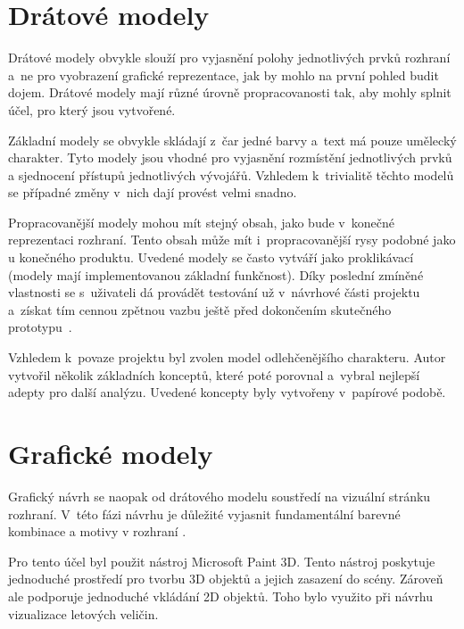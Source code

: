 \section{Drátové modely} %
Drátové modely obvykle slouží pro vyjasnění polohy jednotlivých prvků rozhraní a~ne  pro vyobrazení grafické reprezentace, jak by mohlo na první pohled budit dojem. Drátové modely mají různé úrovně propracovanosti tak, aby mohly splnit účel, pro který jsou vytvořené.

Základní modely se obvykle skládají z~čar jedné barvy a~text má pouze umělecký charakter. Tyto modely jsou vhodné pro vyjasnění rozmístění jednotlivých prvků a sjednocení přístupů jednotlivých vývojářů. Vzhledem k~trivialitě těchto modelů se případné změny v~nich dají provést velmi snadno.

Propracovanější modely mohou mít stejný obsah, jako bude v~konečné reprezentaci rozhraní. Tento obsah může mít i~propracovanější rysy podobné jako u konečného produktu. Uvedené modely se často vytváří jako proklikávací (modely mají implementovanou základní funkčnost). Díky poslední zmíněné vlastnosti se s~uživateli dá provádět testování už v~návrhové části projektu a~získat tím cennou zpětnou vazbu ještě před dokončením skutečného prototypu~\cite{Wireframing,KomárekJakub2022Nzps}.

Vzhledem k~povaze projektu byl zvolen model odlehčenějšího charakteru. Autor vytvořil několik základních konceptů, které poté porovnal a~vybral nejlepší adepty pro další analýzu. Uvedené koncepty byly vytvořeny v~papírové podobě.


\newpage
\section{Grafické modely}
Grafický návrh se naopak od drátového modelu soustředí na vizuální stránku rozhraní. V~této fázi návrhu je důležité vyjasnit fundamentální barevné kombinace a motivy v rozhraní \cite{KomárekJakub2022Nzps}. 

Pro tento účel byl použit nástroj Microsoft Paint 3D. Tento nástroj poskytuje jednoduché prostředí  pro tvorbu 3D objektů a jejich zasazení do scény. Zároveň ale podporuje jednoduché vkládání 2D objektů. Toho bylo využito při návrhu vizualizace letových veličin.



